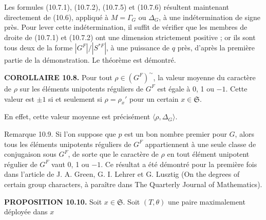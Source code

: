 \documentclass[9pt,twoside]{extarticle}
\begin{document}
{Les formules (10.7.1), (10.7.2), (10.7.5) et (10.7.6) résultent maintenant directement de (10.6), appliqué à \(M=\Gamma_G\) ou \(\Delta_G\), à une indétermination de signe près. Pour lever cette indétermination, il suffit de vérifier que les membres de droite de (10.7.1) et (10.7.2) ont une dimension strictement positive ; or ils sont tous deux de la forme \(|G^F|/|S^{*F}|\), à une puissance de \(q\) près, d'après la première partie de la démonstration. Le théorème est démontré.\par

\noindent\textbf{COROLLAIRE 10.8.} Pour tout \(\rho\in(G^F)^{\sim}\), la valeur moyenne du caractère de \(\rho\) sur les éléments unipotents réguliers de \(G^F\) est égale à 0, 1 ou \(-1\). Cette valeur est \(\pm1\) si et seulement si \(\rho=\rho_x'\) pour un certain \(x\in\mathfrak S\).\par

En effet, cette valeur moyenne est précisément \(\langle\rho,\Delta_G\rangle\).\par

Remarque 10.9. Si l'on suppose que \(p\) est un bon nombre premier pour \(G\), alors tous les éléments unipotents réguliers de \(G^F\) appartiennent à une seule classe de conjugaison sous \(G^F\), de sorte que le caractère de \(\rho\) en tout élément unipotent régulier de \(G^F\) vaut 0, 1 ou \(-1\). Ce résultat a été démontré pour la première fois dans l'article de J. A. Green, G. I. Lehrer et G. Lusztig (On the degrees of certain group characters, à paraître dans The Quarterly Journal of Mathematics).\par

\noindent\textbf{PROPOSITION 10.10.} Soit \(x\in\mathfrak S\). Soit \((T,\theta)\) une paire maximalement déployée dans \(x\)\par
}
\end{document}
